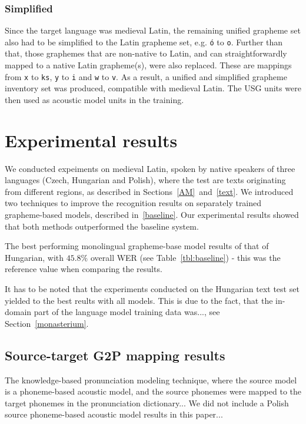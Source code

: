 \documentclass[runningheads,a4paper]{llncs}
\begin{document}
\subsubsection{Simplified}\label{simplified}
Since the target language was medieval Latin, the remaining unified grapheme set also had to be simplified to the Latin grapheme set, e.g. \texttt{\'{o}} to \texttt{o}.
Further than that, those graphemes that are non-native to Latin, and can straightforwardly mapped to a native Latin grapheme(s), were also replaced.
These are mappings from \texttt{x} to \texttt{ks}, \texttt{y} to \texttt{i} and \texttt{w} to \texttt{v}.
As a result, a unified and simplified grapheme inventory set was produced, compatible with medieval Latin.
The USG units were then used as acoustic model units in the training.
\section{Experimental results}\label{results}
We conducted expeiments on medieval Latin, spoken by native speakers of three languages (Czech, Hungarian and Polish), where the test are texts originating from different regions, as described in Sections~\ref{AM}~and~\ref{text}.
We introduced two techniques to improve the recognition results on separately trained grapheme-based models, described in~\ref{baseline}.
Our experimental results showed that both methods outperformed the baseline system.

The best performing monolingual grapheme-base model results of that of Hungarian, with $45.8\%$ overall WER (see Table~\ref{tbl:baseline}) - this was the reference value when comparing the results.

It has to be noted that the experiments conducted on the Hungarian text test set yielded to the best reults with all models.
This is due to the fact, that the in-domain part of the language model training data was..., see Section~\ref{monasterium}.
\subsection{Source-target G2P mapping results}
The knowledge-based pronunciation modeling technique, where the source model is a phoneme-based acoustic model, and the source phonemes were mapped to the target phonemes in the pronunciation dictionary...
We did not include a Polish source phoneme-based acoustic model results in this paper... 
\end{document}
